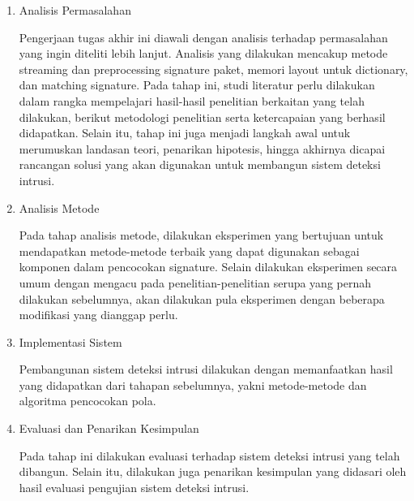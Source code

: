 \begin{enumerate}
    \item Analisis Permasalahan

    Pengerjaan tugas akhir ini diawali dengan analisis terhadap permasalahan yang ingin diteliti lebih lanjut. Analisis yang dilakukan mencakup metode streaming dan preprocessing signature paket, memori layout untuk dictionary, dan matching signature. Pada tahap ini, studi literatur perlu dilakukan dalam rangka mempelajari hasil-hasil penelitian berkaitan yang telah dilakukan, berikut metodologi penelitian serta ketercapaian yang berhasil didapatkan. Selain itu, tahap ini juga menjadi langkah awal untuk merumuskan landasan teori, penarikan hipotesis, hingga akhirnya dicapai rancangan solusi yang akan digunakan untuk membangun sistem deteksi intrusi.

    \item Analisis Metode

    Pada tahap analisis metode, dilakukan eksperimen yang bertujuan untuk mendapatkan metode-metode terbaik yang dapat digunakan sebagai komponen dalam pencocokan signature. Selain dilakukan eksperimen secara umum dengan mengacu pada penelitian-penelitian serupa yang pernah dilakukan sebelumnya, akan dilakukan pula eksperimen dengan beberapa modifikasi yang dianggap perlu.

    \item Implementasi Sistem

    Pembangunan sistem deteksi intrusi dilakukan dengan memanfaatkan hasil yang didapatkan dari tahapan sebelumnya, yakni metode-metode dan algoritma pencocokan pola.

    \item Evaluasi dan Penarikan Kesimpulan

    Pada tahap ini dilakukan evaluasi terhadap sistem deteksi intrusi yang telah dibangun. Selain itu, dilakukan juga penarikan kesimpulan yang didasari oleh hasil evaluasi pengujian sistem deteksi intrusi.

\end{enumerate}



